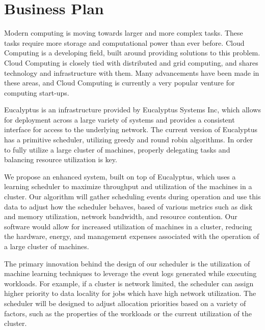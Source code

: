 \section{Business Plan}
  Modern computing is moving towards larger and more complex tasks.  These tasks
  require more storage and computational power than ever before.  Cloud
  Computing is a developing field, built around providing solutions to this
  problem.  Cloud Computing is closely tied with distributed and grid computing,
  and shares technology and infrastructure with them.  Many advancements have
  been made in these areas, and Cloud Computing is currently a very popular
  venture for computing start-ups.

  Eucalyptus is an infrastructure provided by Eucalyptus Systems Inc, which
  allows for deployment across a large variety of systems and provides a
  consistent interface for access to the underlying network.  The current
  version of Eucalyptus has a primitive scheduler, utilizing greedy and round
  robin algorithms.  In order to fully utilize a large cluster of machines,
  properly delegating tasks and balancing resource utilization is key.

  We propose an enhanced system, built on top of Eucalyptus, which uses a
  learning scheduler to maximize throughput and utilization of the machines in a
  cluster.  Our algorithm will gather scheduling events during operation and use
  this data to adjust how the scheduler behaves, based of various metrics such
  as disk and memory utilization, network bandwidth, and resource contention.
  Our software would allow for increased utilization of machines in a cluster,
  reducing the hardware, energy, and management expenses associated with the
  operation of a large cluster of machines.

  The primary innovation behind the design of our scheduler is the utilization
  of machine learning techniques to leverage the event logs generated while
  executing workloads.  For example, if a cluster is network limited, the
  scheduler can assign higher priority to data locality for jobs which have high
  network utilization.  The scheduler will be designed to adjust allocation
  priorities based on a variety of factors, such as the properties of the
  workloads or the current utilization of the cluster.
